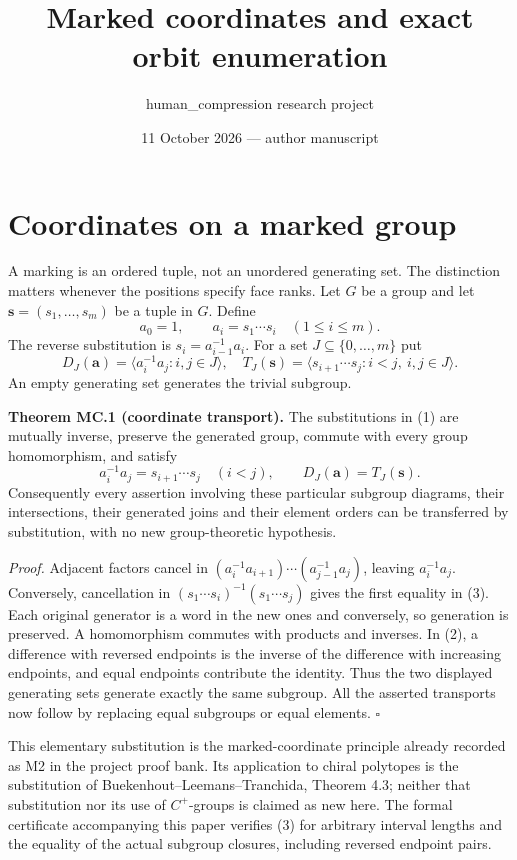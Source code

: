 \documentclass[11pt]{article}
\title{Marked coordinates and exact orbit enumeration}
\author{human\_compression research project}
\date{11 October 2026 --- author manuscript}
\begin{document}
\maketitle
\section{Coordinates on a marked
group}\label{coordinates-on-a-marked-group}

A marking is an ordered tuple, not an unordered generating set. The
distinction matters whenever the positions specify face ranks. Let \(G\)
be a group and let \(\boldsymbol s=(s_1,\ldots,s_m)\) be a tuple in
\(G\). Define \[
a_0=1,\qquad a_i=s_1\cdots s_i\quad(1\leq i\leq m).
\tag{1}
\] The reverse substitution is \(s_i=a_{i-1}^{-1}a_i\). For a set
\(J\subseteq\{0,\ldots,m\}\) put \[
 D_J(\boldsymbol a)=\langle a_i^{-1}a_j:i,j\in J\rangle,
\quad
 T_J(\boldsymbol s)=\langle s_{i+1}\cdots s_j:i<j,\ i,j\in J\rangle.
\tag{2}
\] An empty generating set generates the trivial subgroup.

\textbf{Theorem MC.1 (coordinate transport).} The substitutions in (1)
are mutually inverse, preserve the generated group, commute with every
group homomorphism, and satisfy \[
a_i^{-1}a_j=s_{i+1}\cdots s_j\quad(i<j),\qquad
D_J(\boldsymbol a)=T_J(\boldsymbol s).
\tag{3}
\] Consequently every assertion involving these particular subgroup
diagrams, their intersections, their generated joins and their element
orders can be transferred by substitution, with no new group-theoretic
hypothesis.

\emph{Proof.} Adjacent factors cancel in
\((a_i^{-1}a_{i+1})\cdots(a_{j-1}^{-1}a_j)\), leaving \(a_i^{-1}a_j\).
Conversely, cancellation in \((s_1\cdots s_i)^{-1}(s_1\cdots s_j)\)
gives the first equality in (3). Each original generator is a word in
the new ones and conversely, so generation is preserved. A homomorphism
commutes with products and inverses. In (2), a difference with reversed
endpoints is the inverse of the difference with increasing endpoints,
and equal endpoints contribute the identity. Thus the two displayed
generating sets generate exactly the same subgroup. All the asserted
transports now follow by replacing equal subgroups or equal elements.
\(\square\)

This elementary substitution is the marked-coordinate principle already
recorded as M2 in the project proof bank. Its application to chiral
polytopes is the substitution of Buekenhout--Leemans--Tranchida, Theorem
4.3; neither that substitution nor its use of \(C^+\)-groups is claimed
as new here. The formal certificate accompanying this paper verifies (3)
for arbitrary interval lengths and the equality of the actual subgroup
closures, including reversed endpoint pairs.
\end{document}
